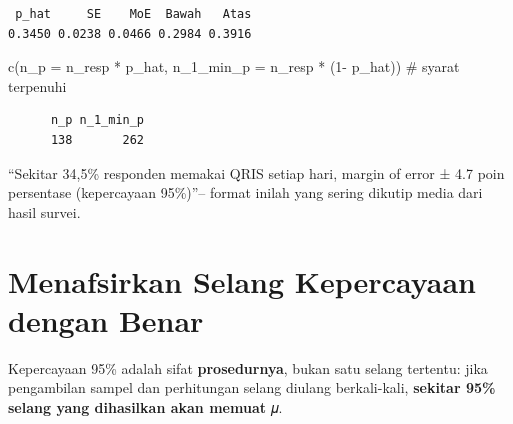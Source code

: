 \documentclass[
  indonesian,
  letterpaper,
]{book}
\newenvironment{Shaded}{\begin{snugshade}}{\end{snugshade}}
\newcommand{\AttributeTok}[1]{\textcolor[rgb]{0.40,0.45,0.13}{#1}}
\newcommand{\CommentTok}[1]{\textcolor[rgb]{0.37,0.37,0.37}{#1}}
\newcommand{\DecValTok}[1]{\textcolor[rgb]{0.68,0.00,0.00}{#1}}
\newcommand{\FunctionTok}[1]{\textcolor[rgb]{0.28,0.35,0.67}{#1}}
\newcommand{\NormalTok}[1]{\textcolor[rgb]{0.00,0.23,0.31}{#1}}
\newcommand{\SpecialCharTok}[1]{\textcolor[rgb]{0.37,0.37,0.37}{#1}}
\begin{document}
\begin{verbatim}
 p_hat     SE    MoE  Bawah   Atas 
0.3450 0.0238 0.0466 0.2984 0.3916 
\end{verbatim}

\begin{Shaded}
\begin{Highlighting}[]
\FunctionTok{c}\NormalTok{(}\AttributeTok{n\_p =}\NormalTok{ n\_resp }\SpecialCharTok{*}\NormalTok{ p\_hat, }\AttributeTok{n\_1\_min\_p =}\NormalTok{ n\_resp }\SpecialCharTok{*}\NormalTok{ (}\DecValTok{1}\SpecialCharTok{{-}}\NormalTok{ p\_hat)) }\CommentTok{\# syarat terpenuhi}
\end{Highlighting}
\end{Shaded}

\begin{verbatim}
      n_p n_1_min_p 
      138       262 
\end{verbatim}

``Sekitar 34,5\% responden memakai QRIS setiap hari, margin of error ±
4.7 poin persentase (kepercayaan 95\%)''-- format inilah yang sering
dikutip media dari hasil survei.

\section{Menafsirkan Selang Kepercayaan dengan
Benar}\label{menafsirkan-selang-kepercayaan-dengan-benar}

Kepercayaan 95\% adalah sifat \textbf{prosedurnya}, bukan satu selang
tertentu: jika pengambilan sampel dan perhitungan selang diulang
berkali-kali, \textbf{sekitar 95\% selang yang dihasilkan akan memuat}
𝜇.
\end{document}

